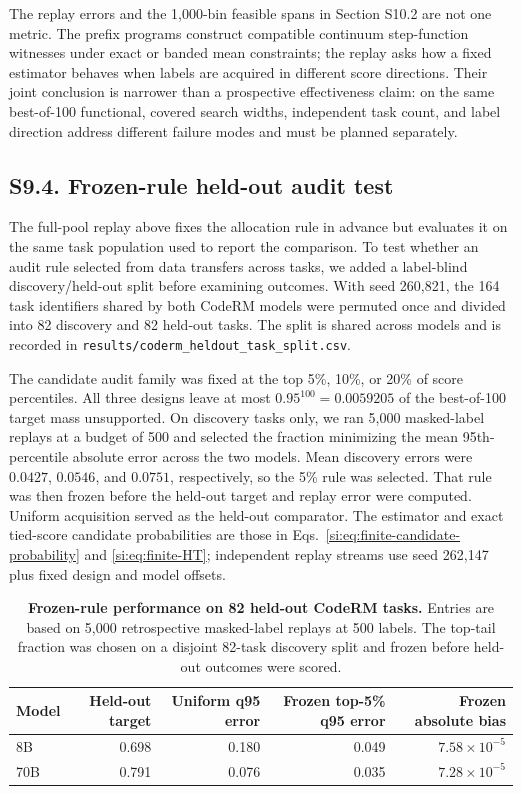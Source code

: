 \documentclass[10pt,twocolumn]{article}
\begin{document}
The replay errors and the 1,000-bin feasible spans in Section S10.2 are not one metric. The prefix programs construct compatible continuum step-function witnesses under exact or banded mean constraints; the replay asks how a fixed estimator behaves when labels are acquired in different score directions. Their joint conclusion is narrower than a prospective effectiveness claim: on the same best-of-100 functional, covered search widths, independent task count, and label direction address different failure modes and must be planned separately.

\subsection*{S9.4. Frozen-rule held-out audit test}

The full-pool replay above fixes the allocation rule in advance but evaluates it on the same task population used to report the comparison. To test whether an audit rule selected from data transfers across tasks, we added a label-blind discovery/held-out split before examining outcomes. With seed 260,821, the 164 task identifiers shared by both CodeRM models were permuted once and divided into 82 discovery and 82 held-out tasks. The split is shared across models and is recorded in \texttt{results/coderm\_heldout\_task\_split.csv}.

The candidate audit family was fixed at the top 5\%, 10\%, or 20\% of score percentiles. All three designs leave at most $0.95^{100}=0.0059205$ of the best-of-100 target mass unsupported. On discovery tasks only, we ran 5,000 masked-label replays at a budget of 500 and selected the fraction minimizing the mean 95th-percentile absolute error across the two models. Mean discovery errors were $0.0427$, $0.0546$, and $0.0751$, respectively, so the 5\% rule was selected. That rule was then frozen before the held-out target and replay error were computed. Uniform acquisition served as the held-out comparator. The estimator and exact tied-score candidate probabilities are those in Eqs.~\ref{si:eq:finite-candidate-probability} and \ref{si:eq:finite-HT}; independent replay streams use seed 262,147 plus fixed design and model offsets.

\begin{table}[h]
\centering
\caption{\textbf{Frozen-rule performance on 82 held-out CodeRM tasks.} Entries are based on 5,000 retrospective masked-label replays at 500 labels. The top-tail fraction was chosen on a disjoint 82-task discovery split and frozen before held-out outcomes were scored.}
\label{si:tab:heldout-audit}
\begin{tabular}{lrrrr}
\toprule
Model & Held-out target & Uniform q95 error & Frozen top-5\% q95 error & Frozen absolute bias \\
\midrule
8B & 0.698 & 0.180 & 0.049 & $7.58\times10^{-5}$ \\
70B & 0.791 & 0.076 & 0.035 & $7.28\times10^{-5}$ \\
\bottomrule
\end{tabular}
\end{table}
\end{document}
